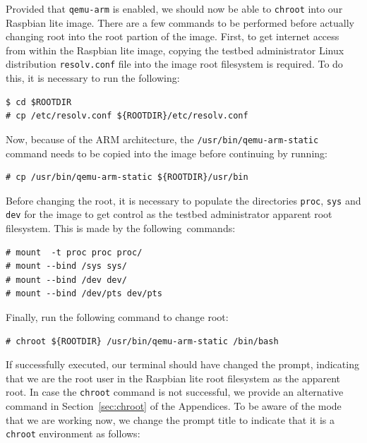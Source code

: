 \documentclass[electronics,article,accept,moreauthors,pdftex,10pt,a4paper]{mdpi}
\theoremstyle{mdpi}
\newcounter{ex}
\newcounter{re}
\theoremstyle{mdpidefinition}
\begin{document}
Provided that \texttt{qemu-arm} is enabled, we should now be able to \texttt{chroot}
into our Raspbian lite image. There are a few commands to be
performed before actually changing root into the root partion of the image.
First, to get internet access from within the Raspbian lite image, copying the testbed administrator Linux distribution \texttt{resolv.conf} file
into the image root filesystem is required. To do this, it is necessary to run the
following:
\begin{lstlisting}[]
$ cd $ROOTDIR
# cp /etc/resolv.conf ${ROOTDIR}/etc/resolv.conf
\end{lstlisting}
\FloatBarrier
\vspace{-5mm}

Now, because of the ARM architecture, the
\texttt{/usr/bin/qemu-arm-static} command needs to be copied into the
image before continuing by running:

\begin{lstlisting}[]
# cp /usr/bin/qemu-arm-static ${ROOTDIR}/usr/bin
\end{lstlisting}
\FloatBarrier
\vspace{-5mm}

Before changing the root, it is necessary to populate the directories
\texttt{proc}, \texttt{sys} and \texttt{dev} for the image to get control
as the testbed administrator apparent root filesystem. This is made by the
following~commands:

\begin{lstlisting}[]
# mount  -t proc proc proc/
# mount --bind /sys sys/
# mount --bind /dev dev/
# mount --bind /dev/pts dev/pts
\end{lstlisting}
\FloatBarrier
\vspace{-5mm}

Finally, run the following command to change root:

\begin{lstlisting}[]
# chroot ${ROOTDIR} /usr/bin/qemu-arm-static /bin/bash
\end{lstlisting}
\FloatBarrier
\vspace{-5mm}

If successfully executed, our terminal should have changed the prompt,
indicating that we are the root user in the Raspbian lite root filesystem as
the apparent root. In case the \texttt{chroot} command is not successful,
we provide an alternative command in Section~\ref{sec:chroot} of the Appendices.
To be aware of the mode that we are working now, we change
the prompt title to indicate that it is a \texttt{chroot} environment as
follows:
\end{document}
